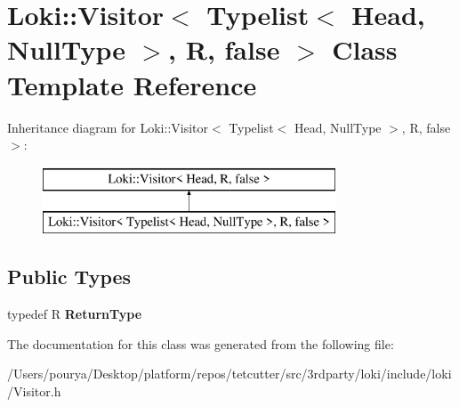 \hypertarget{classLoki_1_1Visitor_3_01Typelist_3_01Head_00_01NullType_01_4_00_01R_00_01false_01_4}{}\section{Loki\+:\+:Visitor$<$ Typelist$<$ Head, Null\+Type $>$, R, false $>$ Class Template Reference}
\label{classLoki_1_1Visitor_3_01Typelist_3_01Head_00_01NullType_01_4_00_01R_00_01false_01_4}
Inheritance diagram for Loki\+:\+:Visitor$<$ Typelist$<$ Head, Null\+Type $>$, R, false $>$\+:\begin{figure}[H]
\begin{center}
\leavevmode
\includegraphics[height=2.000000cm]{classLoki_1_1Visitor_3_01Typelist_3_01Head_00_01NullType_01_4_00_01R_00_01false_01_4}
\end{center}
\end{figure}
\subsection*{Public Types}
\begin{DoxyCompactItemize}
\item 
\hypertarget{classLoki_1_1Visitor_3_01Typelist_3_01Head_00_01NullType_01_4_00_01R_00_01false_01_4_a614a16a9608f9646bb498b4b65462ec1}{}typedef R {\bfseries Return\+Type}\label{classLoki_1_1Visitor_3_01Typelist_3_01Head_00_01NullType_01_4_00_01R_00_01false_01_4_a614a16a9608f9646bb498b4b65462ec1}

\end{DoxyCompactItemize}


The documentation for this class was generated from the following file\+:\begin{DoxyCompactItemize}
\item 
/\+Users/pourya/\+Desktop/platform/repos/tetcutter/src/3rdparty/loki/include/loki/Visitor.\+h\end{DoxyCompactItemize}

